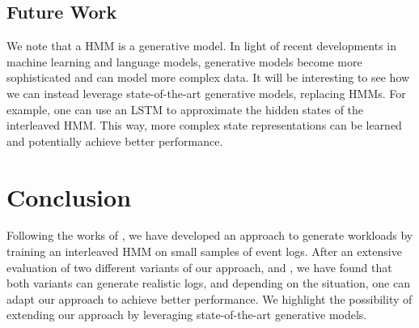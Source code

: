 \subsection{Future Work}

We note that a HMM is a generative model. In light of recent developments in machine learning and language models, generative models become more sophisticated and can model more complex data. It will be interesting to see how we can instead leverage state-of-the-art generative models, replacing HMMs.
For example, one can use an LSTM to approximate the hidden states of the interleaved HMM. This way, more complex state representations can be learned and potentially achieve better performance.

\section{Conclusion}\label{sec:conclusion}

Following the works of \cite{Yadwadkar2010-ml,Minot2014-gn,Chen2019-fu}, we have developed an approach to generate workloads by training an interleaved HMM on small samples of event logs. After an extensive evaluation of two different variants of our approach, \worklogalpha{} and \worklogbeta{}, we have found that both variants can generate realistic logs, and depending on the situation, one can adapt our approach to achieve better performance. We highlight the possibility of extending our approach by leveraging state-of-the-art generative models.

\printbibliography

